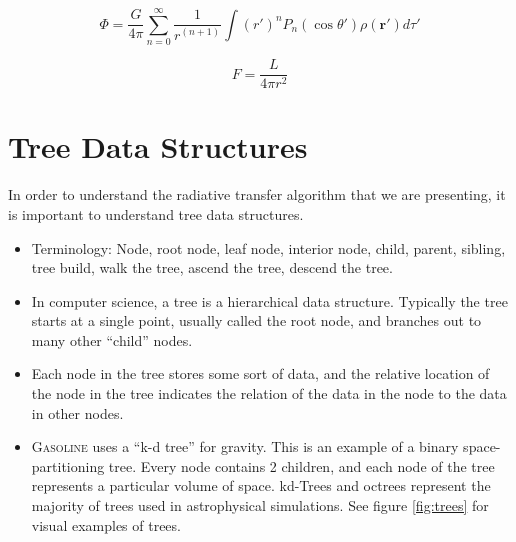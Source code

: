 \begin{equation}
\label{eq:gravitymoments}
\Phi = \frac{G}{4\pi}\sum\limits_{n=0}^{\infty} \frac{1}{r^{(n+1)}}\int (r')^n P_n (\cos{\theta '}) \rho(\boldsymbol r') d\tau '
\end{equation}

\begin{equation}
\label{eq:radiationmoments}
F = \frac{L}{4 \pi r^2}
\end{equation}

\section{Tree Data Structures}
\label{sec:treestruct}

In order to understand the radiative transfer algorithm that we are presenting, it is important to understand tree data structures.

\begin{itemize}
\item Terminology: Node, root node, leaf node, interior node, child, parent, sibling, tree build, walk the tree, ascend the tree, descend the tree.
\item In computer science, a tree is a hierarchical data structure. Typically the tree starts at a single point, usually called the root node, and branches out to many other ``child'' nodes.
\item Each node in the tree stores some sort of data, and the relative location of the node in the tree indicates the relation of the data in the node to the data in other nodes.
\item \textsc{Gasoline} uses a ``k-d tree'' for gravity. This is an example of a binary space-partitioning tree. Every node contains 2 children, and each node of the tree represents a particular volume of space. kd-Trees and octrees represent the majority of trees used in astrophysical simulations. See figure \ref{fig:trees} for visual examples of trees.
\end{itemize}

